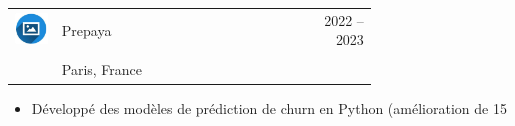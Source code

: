 \documentclass{article}
\begin{document}
\begin{paracol}{2}
\colorbox{maincolor}{%
  \begin{minipage}{\linewidth}
    \begin{tabular}{@{}lp{0.72\linewidth}r}
      \begin{minipage}{0.05\linewidth}
        \includegraphics[width=\linewidth]{picon.png}
      \end{minipage} & 
      Prepaya &  
      {\footnotesize 2022 -- 2023 } \\[-10pt]
      & {\color{sidetext}{Data Scientist}} & \\
      & {\small Paris, France } & \\
    \end{tabular}
\begin{itemize}
    \item Développé des modèles de prédiction de churn en Python (amélioration de 15 %
\end{itemize}
  \end{minipage}%
}

~ \\[-6pt]


\end{paracol}
\end{document}
